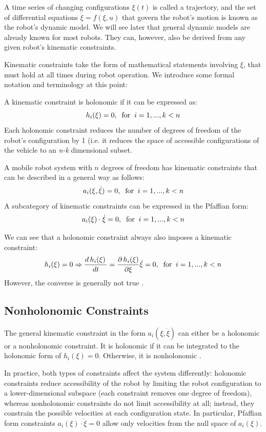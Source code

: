 \documentclass[twoside]{article}
\begin{document}
A time series of changing configurations $ \xi(t) $ is called a trajectory, and the set of differential equations $ \dot{\xi} = f(\xi,u) $ that govern the robot's motion is known as the robot's dynamic model. We will see later that general dynamic models are already known for most robots. They can, however, also be derived from any given robot's kinematic constraints.

Kinematic constraints take the form of mathematical statements involving $\xi$, that must hold at all times during robot operation. We introduce some formal notation and terminology at this point:

\begin{frm-def}
A kinematic constraint is holonomic if it can be expressed as:
$$
h_i(\xi) = 0,\;\;\textup{for}\;\;i = 1,...,k < n
$$
Each holonomic constraint reduces the number of degrees of freedom of the robot's configuration by 1 (i.e. it reduces the space of accessible configurations of the vehicle to an \textit{n-k} dimensional subset.
\end{frm-def}

\begin{frm-def}
A mobile robot system with $n$ degrees of freedom has kinematic constraints that can be described in a general way as follows:
$$
a_i (\xi, \dot{\xi})=0,\;\;\textup{for}\;\;i = 1,...,k < n
$$
A subcategory of kinematic constraints can be expressed in the Pfaffian form:
$$
a_i(\xi) \cdot \dot{\xi} = 0,\;\;\textup{for}\;\;i = 1,...,k < n
$$
\end{frm-def}

We can see that a holonomic constraint always also imposes a kinematic constraint:
$$
h_i(\xi) = 0 \Rightarrow \frac{d\,h_i(\xi)\, }{dt} = \frac{\partial\,h_i(\xi)}{\partial \xi} \dot{\xi} = 0,\;\;\textup{for}\;\;i = 1,...,k < n
$$
However, the converse is generally not true \cite{ssvo}.

\subsection*{Nonholonomic Constraints}

The general kinematic constraint in the form $ a_i (\xi, \dot{\xi}) $ can either be a holonomic or a nonholonomic constraint. It is holonomic if it can be integrated to the holonomic form of $ h_i(\xi) = 0 $. Otherwise, it is nonholonomic \cite{ssvo}.

In practice, both types of constraints affect the system differently: holonomic constraints reduce accessibility of the robot by limiting the robot configuration to a lower-dimensional subspace (each constraint removes one degree of freedom), whereas nonholonomic constraints do not limit accessibility at all; instead, they constrain the possible velocities at each configuration state. In particular, Pfaffian form constraints $ a_i(\xi) \cdot \dot{\xi} = 0 $ allow only velocities from the null space of $ a_i (\xi) $. 
\end{document}
